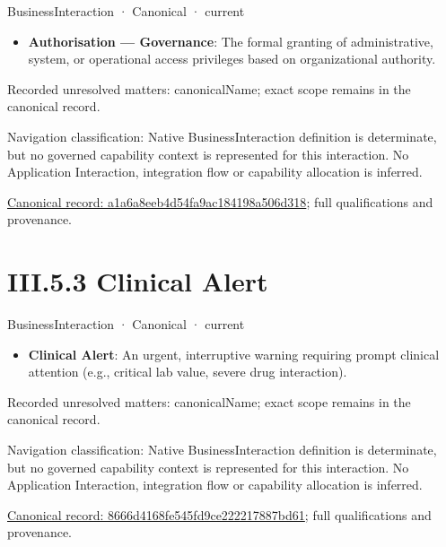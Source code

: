 \label{element:a1a6a8eeb4d54fa9ac184198a506d318}
{\small BusinessInteraction · Canonical · current}\par

\begin{itemize}


\item \textbf{Authorisation — Governance}: The formal granting of administrative, system, or operational access privileges based on organizational authority.

\end{itemize}

{\small Recorded unresolved matters: canonicalName; exact scope remains in the canonical record.}\par
{\small Navigation classification: Native BusinessInteraction definition is determinate, but no governed capability context is represented for this interaction. No Application Interaction, integration flow or capability allocation is inferred.}\par
{\footnotesize \href{../../../../continuum/business/business-interaction/a1a6a8eeb4d54fa9ac184198a506d318.md}{Canonical record: a1a6a8eeb4d54fa9ac184198a506d318}; full qualifications and provenance.}\par
\section*{III.5.3 Clinical Alert}
\label{navigation:III.5.3}

\label{element:8666d4168fe545fd9ce222217887bd61}
{\small BusinessInteraction · Canonical · current}\par

\begin{itemize}


\item \textbf{Clinical Alert}: An urgent, interruptive warning requiring prompt clinical attention (e.g., critical lab value, severe drug interaction).

\end{itemize}

{\small Recorded unresolved matters: canonicalName; exact scope remains in the canonical record.}\par
{\small Navigation classification: Native BusinessInteraction definition is determinate, but no governed capability context is represented for this interaction. No Application Interaction, integration flow or capability allocation is inferred.}\par
{\footnotesize \href{../../../../continuum/business/business-interaction/8666d4168fe545fd9ce222217887bd61.md}{Canonical record: 8666d4168fe545fd9ce222217887bd61}; full qualifications and provenance.}\par
